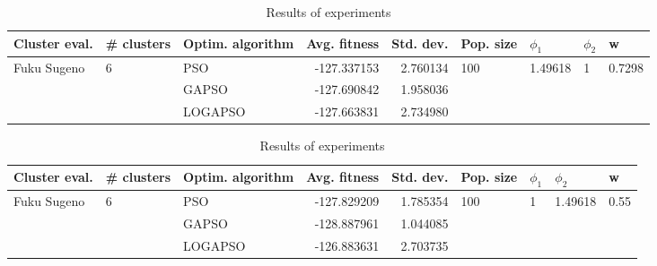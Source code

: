 \documentclass{article}
\begin{document}
\begin{table}
\centering
\caption{Results of experiments}
\begin{tabular}{lllrrllll}
\toprule
               Cluster eval. &        \# clusters & Optim. algorithm &  Avg. fitness &  Std. dev. &            Pop. size &               $\phi_{1}$ &         $\phi_{2}$ &                       w \\
\midrule
\multirow{3}{*}{Fuku Sugeno} & \multirow{3}{*}{6} &              PSO &   -127.337153 &   2.760134 & \multirow{3}{*}{100} & \multirow{3}{*}{1.49618} & \multirow{3}{*}{1} & \multirow{3}{*}{0.7298} \\
                             &                    &            GAPSO &   -127.690842 &   1.958036 &                      &                          &                    &                         \\
                             &                    &          LOGAPSO &   -127.663831 &   2.734980 &                      &                          &                    &                         \\
\bottomrule
\end{tabular}
\end{table}
\begin{table}
\centering
\caption{Results of experiments}
\begin{tabular}{lllrrllll}
\toprule
               Cluster eval. &        \# clusters & Optim. algorithm &  Avg. fitness &  Std. dev. &            Pop. size &         $\phi_{1}$ &               $\phi_{2}$ &                     w \\
\midrule
\multirow{3}{*}{Fuku Sugeno} & \multirow{3}{*}{6} &              PSO &   -127.829209 &   1.785354 & \multirow{3}{*}{100} & \multirow{3}{*}{1} & \multirow{3}{*}{1.49618} & \multirow{3}{*}{0.55} \\
                             &                    &            GAPSO &   -128.887961 &   1.044085 &                      &                    &                          &                       \\
                             &                    &          LOGAPSO &   -126.883631 &   2.703735 &                      &                    &                          &                       \\
\bottomrule
\end{tabular}
\end{table}
\end{document}

